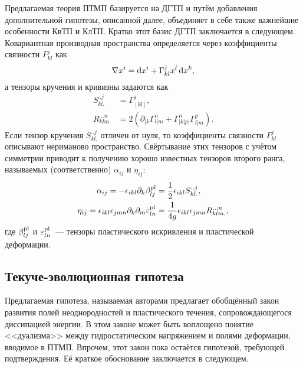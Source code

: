 \documentclass[a4paper, 14pt, titlepage]{extarticle}
\newcommand{\plast}{\textup{pl}} %
\newcommand{\Sklj}{S^{..j}_{kl.}}  %
\newcommand{\Rklmn}{R^{...n}_{klm.}} %
\begin{document}
  Предлагаемая теория ПТМП базируется на ДГТП и путём добавления дополнительной гипотезы, описанной
  далее, объединяет в себе также важнейшие особенности КвТП и КлТП. Кратко этот базис ДГТП
  заключается в следующем. Ковариантная производная пространства определяется через коэффициенты
  связности $\Gamma^j_{kl}$ как
  \[
    \nabla x^i = \dif x^i + \Gamma^j_{kl} x^l \dif x ^k,
  \]
  а тензоры кручения и кривизны задаются как
  \begin{align*}
    \Sklj  & = \Gamma^j_{[kl]}, \\
    \Rklmn & = 2\left( \partial_{[k}\Gamma^n_{l]m} + \Gamma^n_{[k|p|}\Gamma^p_{l]m} \right).
  \end{align*}
  Если тензор кручения $\Sklj$ отличен от нуля, то коэффициенты связности $\Gamma^j_{kl}$ описывают
  нериманово пространство. Свёртывание этих тензоров с учётом симметрии приводит к получению хорошо
  известных тензоров второго ранга, называемых (соответственно) 
  $\alpha_{ij}$ и  $\eta_{ij}$:
  \begin{align*}
    \alpha_{ij} = - \epsilon_{ikl} \partial_k \beta^{\plast}_{lj}
              & = \frac{1}{2} \epsilon_{ikl}\Sklj,\\
    \eta_{ij}   = \epsilon_{ikl}\epsilon_{jmn} \partial_k\partial_m \varepsilon^{\plast}_{ln}
              & = \frac{1}{4g}\epsilon_{ikl}\epsilon_{jmn}\Rklmn,
  \end{align*}
  где $\beta^{\plast}_{lj}$ и $\varepsilon^{\plast}_{ln}$~--- тензоры пластического искривления и
  пластической деформации.

  \subsection{Текуче-эволюционная гипотеза}

  Предлагаемая гипотеза, называемая авторами  предлагает обобщённый
  закон развития полей неоднородностей и пластического течения, сопровождающегося диссипацией
  энергии. В этом законе может быть воплощено понятие <<дуализма>> между гидростатическим
  напряжением и полями деформации, вводимое в ПТМП. Впрочем, этот закон пока остаётся гипотезой,
  требующей подтверждения. Её краткое обоснование заключается в следующем.
\end{document}
